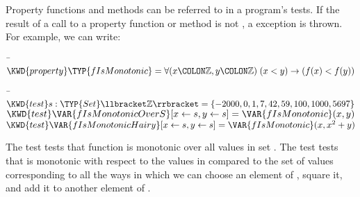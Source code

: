 Property functions and methods can be referred to in a program's tests.
If the result of a call to a property function or method is not
, a  exception is thrown. For example, we can
write:
\begin{Fortress}
{\tt~}\pushtabs\=\+\( \KWD{property} \TYP{fIsMonotonic} = \forall(x\COLON \mathbb{Z}, y\COLON \mathbb{Z})\; (x < y) \rightarrow (f(x) < f(y))\)\-\\\poptabs
\end{Fortress}
\begin{Fortress}
{\tt~}\pushtabs\=\+\( \KWD{test} s \mathrel{\mathtt{:}} \TYP{Set}\llbracket\mathbb{Z}\rrbracket = \{-2000, 0, 1, 7, 42, 59, 100, 1000, 5697\}\)\\
\( \KWD{test} \VAR{fIsMonotonicOverS} [x \leftarrow s, y \leftarrow s] = \VAR{fIsMonotonic}(x,y)\)\\
\( \KWD{test} \VAR{fIsMonotonicHairy} [x \leftarrow s, y \leftarrow s] = \VAR{fIsMonotonic}(x, x^{2} + y)\)\-\\\poptabs
\end{Fortress}
The test  tests that function  is
monotonic
over all values in set . The test 
tests that  is monotonic with respect to the values in 
compared to the set of values corresponding to all the ways in which
we can choose an element of , square it,
and add it to another element of .
